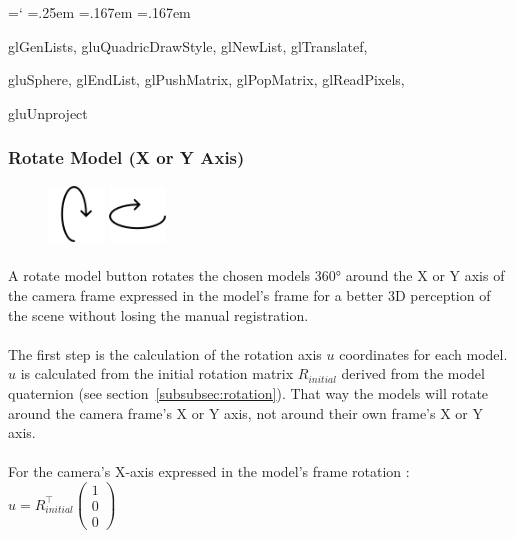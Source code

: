 \documentclass[12pt]{report}
\DeclareRobustCommand*{\ttfamily}{
  \origttfamily
  \hyphenchar\font=`\-\relax
  \fontdimen3\font=.25em\relax
  \fontdimen4\font=.167em\relax
  \fontdimen7\font=.167em\relax
}
\newenvironment{code}{\ttfamily}{}
\begin{document}
	\begin{code}
	glGenLists, gluQuadricDrawStyle, glNewList, glTranslatef,

	gluSphere, glEndList, glPushMatrix, glPopMatrix, glReadPixels,

	gluUnproject
	\end{code}



\subsubsection{Rotate Model (X or Y Axis)}

\begin{figure}
\vspace{-20pt}
\includegraphics[width=1.5cm]{icons/rotateX.png}
\endminipage
\includegraphics[width=1.5cm]{icons/rotateY.png}
\endminipage
\end{figure}
\paragraph{}
	A rotate model button rotates the chosen models 360° around the X or Y axis of the camera frame expressed in the model's frame for a better 3D perception of the scene without losing the manual registration.

\paragraph{}
The first step is the calculation of the rotation axis $u$ coordinates for each model. $u$ is calculated from the initial rotation matrix $R_{initial}$ derived from the model quaternion (see section~\ref{subsubsec:rotation}). That way the models will rotate around the camera frame's X or Y axis, not around their own frame's X or Y axis.


\paragraph{}
For the camera's X-axis expressed in the model's frame rotation : $u = R_{initial}^\top \left( \begin{array}{cc}
	1 \\
    0 \\
    0 \end{array} \right)$
\end{document}
